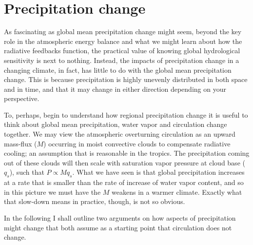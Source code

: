 \documentclass[12pt]{book}
\begin{document}
\section{Precipitation change}
As fascinating as global mean precipitation change might seem, beyond the key role in the atmospheric energy balance and what we might learn about how the radiative feedbacks function, the practical value of knowing global hydrological sensitivity is next to nothing. Instead, the impacts of precipitation change in a changing climate, in fact, has little to do with the global mean precipitation change. This is because precipitation is highly unevenly distributed in both space and in time, and that it may change in either direction depending on your perspective.

To, perhaps, begin to understand how regional precipitation change it is useful to think about global mean precipitation, water vapor and circulation change together. We may view the atmospheric overturning circulation as an upward mass-flux ($M$) occurring in moist convective clouds to compensate radiative cooling; an assumption that is reasonable in the tropics. The precipitation coming out of these clouds will then scale with saturation vapor pressure at cloud base ($q_s$), such that $P \propto Mq_s$. What we have seen is that global precipitation increases at a rate that is smaller than the rate of increase of water vapor content, and so in this picture we must have the $M$ weakens in a warmer climate. Exactly what that slow-down means in practice, though, is not so obvious.

In the following I shall outline two arguments on how aspects of precipitation might change that both assume as a starting point that circulation does not change. 
\end{document}
